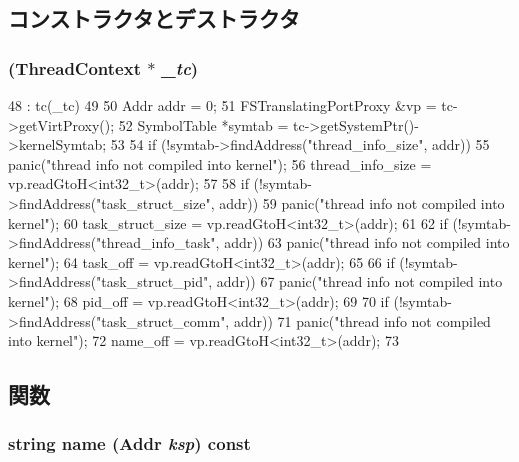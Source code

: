 \subsection{コンストラクタとデストラクタ}
\hypertarget{classAlphaISA_1_1ProcessInfo_a9c31978febe8b0cc8e9e76eb6791312b}{
\subsubsection[{ProcessInfo}]{ ({\bf ThreadContext} $\ast$ {\em \_\-tc})}}
\label{classAlphaISA_1_1ProcessInfo_a9c31978febe8b0cc8e9e76eb6791312b}



\begin{DoxyCode}
48     : tc(_tc)
49 {
50     Addr addr = 0;
51     FSTranslatingPortProxy &vp = tc->getVirtProxy();
52     SymbolTable *symtab = tc->getSystemPtr()->kernelSymtab;
53 
54     if (!symtab->findAddress("thread_info_size", addr))
55         panic("thread info not compiled into kernel\n");
56     thread_info_size = vp.readGtoH<int32_t>(addr);
57 
58     if (!symtab->findAddress("task_struct_size", addr))
59         panic("thread info not compiled into kernel\n");
60     task_struct_size = vp.readGtoH<int32_t>(addr);
61 
62     if (!symtab->findAddress("thread_info_task", addr))
63         panic("thread info not compiled into kernel\n");
64     task_off = vp.readGtoH<int32_t>(addr);
65 
66     if (!symtab->findAddress("task_struct_pid", addr))
67         panic("thread info not compiled into kernel\n");
68     pid_off = vp.readGtoH<int32_t>(addr);
69 
70     if (!symtab->findAddress("task_struct_comm", addr))
71         panic("thread info not compiled into kernel\n");
72     name_off = vp.readGtoH<int32_t>(addr);
73 }
\end{DoxyCode}


\subsection{関数}
\hypertarget{classAlphaISA_1_1ProcessInfo_ae39ec1168c2ea31862bebf2afeda34d8}{
\subsubsection[{name}]{\setlength{\rightskip}{0pt plus 5cm}string name ({\bf Addr} {\em ksp}) const}}
\label{classAlphaISA_1_1ProcessInfo_ae39ec1168c2ea31862bebf2afeda34d8}



